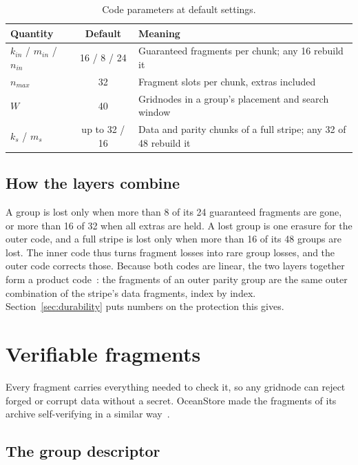 \documentclass[10pt,a4paper,final]{article}
\begin{document}
\begin{table}[H]
\centering
\small
\begin{tabularx}{\linewidth}{@{}lcL@{}}
\toprule
Quantity & Default & Meaning \\
\midrule
$k_{in}$ / $m_{in}$ / $n_{in}$ & 16 / 8 / 24 & Guaranteed fragments per chunk; any 16 rebuild it \\
$n_{max}$ & 32 & Fragment slots per chunk, extras included \\
$W$ & 40 & Gridnodes in a group's placement and search window \\
$k_s$ / $m_s$ & up to 32 / 16 & Data and parity chunks of a full stripe; any 32 of 48 rebuild it \\
\bottomrule
\end{tabularx}
\caption{Code parameters at default settings.}
\end{table}

\subsection{How the layers combine}

A group is lost only when more than 8 of its 24 guaranteed fragments are gone, or more than 16 of 32 when all
extras are held. A lost group is one erasure for the outer code, and a full stripe is lost only when more than 16 of
its 48 groups are lost. The inner code thus turns fragment losses into rare group losses, and the outer code
corrects those. Because both codes are linear, the two layers together form a product code~\cite{elias1954}: the
fragments of an outer parity group are the same outer combination of the stripe's data fragments, index by index.
Section~\ref{sec:durability} puts numbers on the protection this gives.

\section{Verifiable fragments}
\label{sec:fragments}

Every fragment carries everything needed to check it, so any gridnode can reject forged or corrupt data without a
secret. OceanStore made the fragments of its archive self-verifying in a similar way~\cite{kubiatowicz2000}.

\subsection{The group descriptor}
\end{document}
